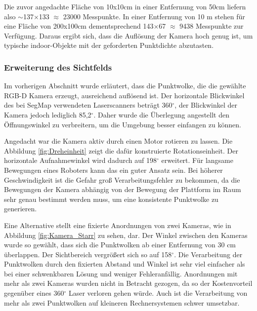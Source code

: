 Die zuvor angedachte Fläche von 10x10cm in einer Entfernung von 50cm liefern also $\sim$137$\times$133 $\approx$ 23000 Messpunkte. In einer Entfernung von 10 m stehen für eine Fläche von 200x100cm dementsprechend 143$\times$67 $\approx$ 9438 Messpunkte zur Verfügung. Daraus ergibt sich, dass die Auflösung der Kamera hoch genug ist, um typische indoor-Objekte mit der geforderten Punktdichte abzutasten. 


\subsubsection{Erweiterung des Sichtfelds} 
\label{sec:stereo}
 
Im vorherigen Abschnitt wurde erläutert, dass die Punktwolke, die die gewählte RGB-D Kamera erzeugt, ausreichend auflösend ist. Der horizontale Blickwinkel des bei SegMap verwendeten Laserscanners beträgt 360$^\circ$, der Blickwinkel der Kamera jedoch lediglich 85,2$^\circ$. Daher wurde die Überlegung angestellt den Öffnungswinkel zu verbreitern, um die Umgebung besser einfangen zu können. 

Angedacht war die Kamera aktiv durch einen Motor rotieren zu lassen. Die Abbildung \ref{fig:Dreheinheit} zeigt die dafür konstruierte Rotationseinheit. Der horizontale Aufnahmewinkel wird dadurch auf 198$^\circ$ erweitert. Für langsame Bewegungen eines Roboters kann das ein guter Ansatz sein. Bei höherer Geschwindigkeit ist die Gefahr groß Verarbeitungsfehler zu bekommen, da die Bewegungen der Kamera abhängig von der Bewegung der Plattform im Raum sehr genau bestimmt werden muss, um eine konsistente Punktwolke zu generieren.

Eine Alternative stellt eine fixierte Anordnungen von zwei Kameras, wie in Abbildung \ref{fig:Kamera_Starr} zu sehen, dar. Der Winkel zwischen den Kameras wurde so gewählt, dass sich die Punktwolken ab einer Entfernung von 30 cm überlappen. Der Sichtbereich vergrößert sich so auf 158$^\circ$. Die Verarbeitung der Punktwolken durch den fixierten Abstand und Winkel ist sehr viel einfacher als bei einer schwenkbaren Lösung und weniger Fehleranfällig. Anordnungen mit mehr als zwei Kameras wurden nicht in Betracht gezogen, da so der Kostenvorteil gegenüber eines 360$^\circ$ Laser verloren gehen würde. Auch ist die Verarbeitung von mehr als zwei Punktwolken auf kleineren Rechnersystemen schwer umsetzbar.

